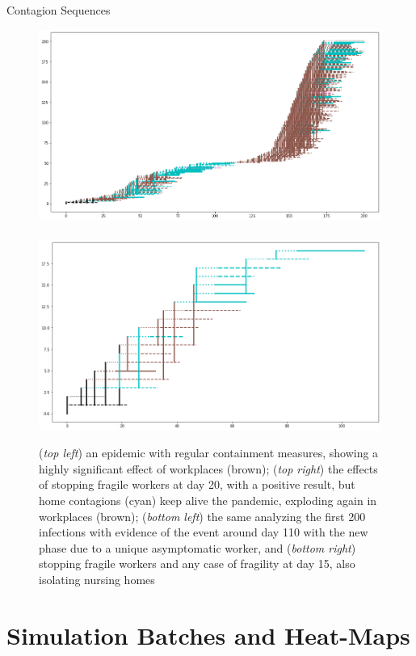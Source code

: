 \documentclass[8pt]{beamer}
\begin{document}
\begin{frame}{Contagion Sequences}
\begin{figure}[H]
\center
\includegraphics[scale=0.105]{withShort1A200.png}~~~~~~~~~~~\includegraphics[scale=0.105]{withShort1B.png} \\
\caption{(\emph{top left}) an epidemic with regular containment measures, showing a highly significant effect of workplaces (brown);
 (\emph{top right}) the effects of stopping fragile workers at day 20, with a positive result, but home contagions (cyan) keep alive the pandemic, exploding again in workplaces (brown); (\emph{bottom left}) the same analyzing the first 200 infections with evidence of the event around day 110 with the new phase due to a unique asymptomatic worker, and (\emph{bottom right}) stopping fragile workers and any case of fragility at day 15, also isolating nursing homes} 
\label{fourSequences}
\end{figure}

\end{frame}

\section{Simulation Batches and Heat-Maps}
\end{document}
